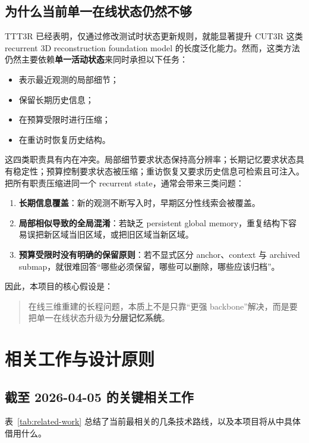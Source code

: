 \documentclass[12pt]{article}
\begin{document}
\subsection{为什么当前单一在线状态仍然不够}

TTT3R 已经表明，仅通过修改测试时状态更新规则，就能显著提升 CUT3R 这类 recurrent 3D reconstruction foundation model 的长度泛化能力。然而，这类方法仍然主要依赖\textbf{单一活动状态}来同时承担以下任务：
\begin{itemize}
  \item 表示最近观测的局部细节；
  \item 保留长期历史信息；
  \item 在预算受限时进行压缩；
  \item 在重访时恢复历史结构。
\end{itemize}

这四类职责具有内在冲突。局部细节要求状态保持高分辨率；长期记忆要求状态具有稳定性；预算控制要求状态被压缩；重访恢复又要求历史信息可检索且可注入。把所有职责压缩进同一个 recurrent state，通常会带来三类问题：
\begin{enumerate}
  \item \textbf{长期信息覆盖}：新的观测不断写入时，早期区分性线索会被覆盖。
  \item \textbf{局部相似导致的全局混淆}：若缺乏 persistent global memory，重复结构下容易误把新区域当旧区域，或把旧区域当新区域。
  \item \textbf{预算受限时没有明确的保留原则}：若不显式区分 anchor、context 与 archived submap，就很难回答“哪些必须保留，哪些可以删除，哪些应该归档”。
\end{enumerate}

因此，本项目的核心假设是：
\begin{quote}
在线三维重建的长程问题，本质上不是只靠“更强 backbone”解决，而是要把单一在线状态升级为\textbf{分层记忆系统}。
\end{quote}

\section{相关工作与设计原则}

\subsection{截至 2026-04-05 的关键相关工作}

表~\ref{tab:related-work} 总结了当前最相关的几条技术路线，以及本项目将从中具体借用什么。
\end{document}
